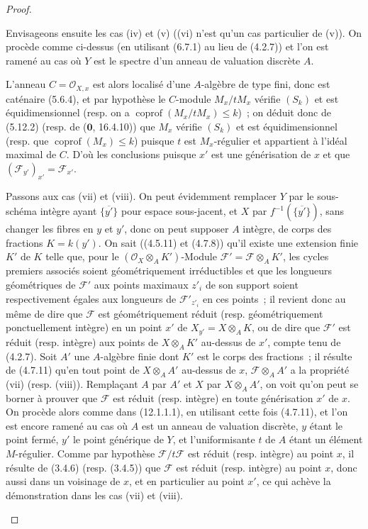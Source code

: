 \begin{proof}
\begin{env}[12.1.1.2]
\label{IV.12.1.1.2-fr}
Envisageons ensuite les cas (iv) et (v) ((vi) n'est qu'un cas particulier de
(v)). On procède comme ci-dessus (en utilisant (6.7.1) au lieu de (4.2.7)) et
l'on est ramené au cas où $Y$ est le spectre d'un anneau de valuation discrète
$A$.

L'anneau $C=\mathcal O_{X,x}$ est alors localisé d'une $A$-algèbre de type
fini, donc est caténaire (5.6.4), et par hypothèse le $C$-module
$M_x/tM_x$ vérifie $(S_k)$ et est équidimensionnel (resp. on a
$\operatorname{coprof}(M_x/tM_x)\leq k$)~; on déduit donc de (5.12.2) (resp.
de ($\mathbf 0$, 16.4.10)) que $M_x$ vérifie $(S_k)$ et est équidimensionnel
(resp. que $\operatorname{coprof}(M_x)\leq k$) puisque $t$ est $M_x$-régulier
et appartient à l'idéal maximal de $C$. D'où les conclusions puisque $x'$ est
une générisation de $x$ et que $(\mathcal F_{y'})_{x'}=\mathcal F_{x'}$.
\end{env}

\begin{env}[12.1.1.3]
\label{IV.12.1.1.3-fr}
Passons aux cas (vii) et (viii). On peut évidemment remplacer $Y$ par le
sous-schéma intègre ayant $\overline{\{y'\}}$ pour espace sous-jacent, et $X$
par $f^{-1}(\overline{\{y'\}})$, sans changer les fibres en $y$ et $y'$, donc
on peut supposer $A$ intègre, de corps des fractions $K=k(y')$. On sait
((4.5.11) et (4.7.8)) qu'il existe une extension finie $K'$ de $K$ telle que,
pour le $(\mathcal O_X\otimes_AK')$-Module
$\mathcal F'=\mathcal F\otimes_AK'$, les cycles premiers associés soient
géométriquement irréductibles et que les longueurs géométriques de
$\mathcal F'$ aux points maximaux $z'_i$ de son support soient respectivement
égales aux longueurs de $\mathcal F'_{z'_i}$ en ces points~; il revient donc
au même de dire que $\mathcal F$ est géométriquement réduit (resp.
géométriquement ponctuellement intègre) en un point $x'$ de
$X_{y'}=X\otimes_AK$, ou de dire que $\mathcal F'$ est réduit (resp. intègre)
aux points de $X\otimes_AK'$ au-dessus de $x'$, compte tenu de (4.2.7). Soit
$A'$ une $A$-algèbre finie dont $K'$ est le corps des fractions~; il résulte
de (4.7.11) qu'en tout point de $X\otimes_AA'$ au-dessus de $x$,
$\mathcal F\otimes_AA'$ a la propriété (vii) (resp. (viii)). Remplaçant $A$
par $A'$ et $X$ par $X\otimes_AA'$, on voit qu'on peut se borner à prouver que
$\mathcal F$ est réduit (resp. intègre) en toute générisation $x'$ de $x$. On
procède alors comme dans (12.1.1.1), en utilisant cette fois (4.7.11), et l'on
est encore ramené au cas où $A$ est un anneau de valuation discrète, $y$ étant
le point fermé, $y'$ le point générique de $Y$, et l'uniformisante $t$ de $A$
étant un élément $M$-régulier. Comme par hypothèse
$\mathcal F/t\mathcal F$ est réduit (resp. intègre) au point $x$, il résulte de
(3.4.6) (resp. (3.4.5)) que $\mathcal F$ est réduit (resp. intègre) au point
$x$, donc aussi dans un voisinage de $x$, et en particulier au point $x'$, ce
qui achève la démonstration dans les cas (vii) et (viii).
\end{env}


\end{proof}
